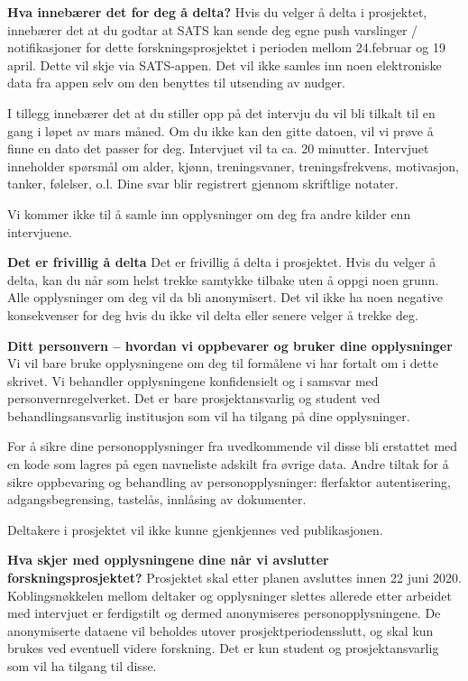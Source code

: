 \textbf{Hva innebærer det for deg å delta?}
\bigbreak
Hvis du velger å delta i prosjektet, innebærer det at du godtar at SATS kan sende deg egne push varslinger / notifikasjoner for dette forskningsprosjektet i perioden mellom 24.februar og 19 april. Dette vil skje via SATS-appen. Det vil ikke samles inn noen elektroniske data fra appen selv om den benyttes til utsending av nudger.

I tillegg innebærer det at du stiller opp på det intervju du vil bli tilkalt til en gang i løpet av mars måned. Om du ikke kan den gitte datoen, vil vi prøve å finne en dato det passer for deg. Intervjuet vil ta ca. 20 minutter. Intervjuet inneholder spørsmål om alder, kjønn, treningsvaner, treningsfrekvens, motivasjon, tanker, følelser, o.l. Dine svar blir registrert gjennom skriftlige notater. 

Vi kommer ikke til å samle inn opplysninger om deg fra andre kilder enn intervjuene.  
 
\textbf{Det er frivillig å delta}
\bigbreak
Det er frivillig å delta i prosjektet. Hvis du velger å delta, kan du når som helst trekke samtykke tilbake uten å oppgi noen grunn. Alle opplysninger om deg vil da bli anonymisert. Det vil ikke ha noen negative konsekvenser for deg hvis du ikke vil delta eller senere velger å trekke deg.
 
\textbf{Ditt personvern – hvordan vi oppbevarer og bruker dine opplysninger}
\bigbreak
Vi vil bare bruke opplysningene om deg til formålene vi har fortalt om i dette skrivet. Vi behandler opplysningene konfidensielt og i samsvar med personvernregelverket.
Det er bare prosjektansvarlig og student ved behandlingsansvarlig institusjon som vil ha tilgang på dine opplysninger.

For å sikre dine personopplysninger fra uvedkommende vil disse bli erstattet med en kode som lagres på egen navneliste adskilt fra øvrige data. Andre tiltak for å sikre oppbevaring og behandling av personopplysninger: flerfaktor autentisering, adgangsbegrensing, tastelås, innlåsing av dokumenter.  

Deltakere i prosjektet vil ikke kunne gjenkjennes ved publikasjonen. 

\textbf{Hva skjer med opplysningene dine når vi avslutter forskningsprosjektet?}
\bigbreak
Prosjektet skal etter planen avsluttes innen 22 juni 2020. Koblingsnøkkelen mellom deltaker og opplysninger slettes allerede etter arbeidet med intervjuet er ferdigstilt og dermed anonymiseres personopplysningene. De anonymiserte dataene vil beholdes utover prosjektperiodensslutt, og skal kun brukes ved eventuell videre forskning. Det er kun student og prosjektansvarlig som vil ha tilgang til disse. 
 
